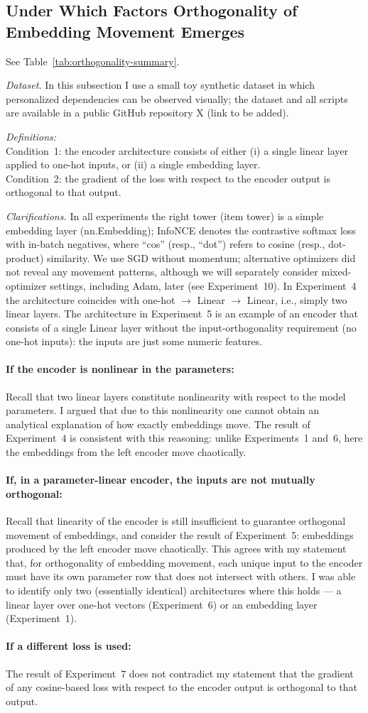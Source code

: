 \subsection{Under Which Factors Orthogonality of Embedding Movement Emerges}

See Table~\ref{tab:orthogonality-summary}.

\textit{Dataset.} In this subsection I use a small toy synthetic dataset in which personalized dependencies can be observed visually; the dataset and all scripts are available in a public GitHub repository X (link to be added).

\textit{Definitions:}\\
Condition~1: the encoder architecture consists of either (i) a single linear layer applied to one-hot inputs, or (ii) a single embedding layer.\\ 
Condition~2: the gradient of the loss with respect to the encoder output is orthogonal to that output.

\textit{Clarifications.} In all experiments the right tower (item tower) is a simple embedding layer (nn.Embedding); InfoNCE denotes the contrastive softmax loss with in-batch negatives, where ``cos'' (resp., ``dot'') refers to cosine (resp., dot-product) similarity. We use SGD without momentum; alternative optimizers did not reveal any movement patterns, although we will separately consider mixed-optimizer settings, including Adam, later (see Experiment~10). In Experiment~4 the architecture coincides with one-hot $\to$ Linear $\to$ Linear, i.e., simply two linear layers. The architecture in Experiment~5 is an example of an encoder that consists of a single Linear layer without the input-orthogonality requirement (no one-hot inputs): the inputs are just some numeric features.

\paragraph{If the encoder is nonlinear in the parameters:}
Recall that two linear layers constitute nonlinearity with respect to the model parameters. I argued that due to this nonlinearity one cannot obtain an analytical explanation of how exactly embeddings move. The result of Experiment~4 is consistent with this reasoning: unlike Experiments~1 and~6, here the embeddings from the left encoder move chaotically.

\paragraph{If, in a parameter-linear encoder, the inputs are not mutually orthogonal:}
Recall that linearity of the encoder is still insufficient to guarantee orthogonal movement of embeddings, and consider the result of Experiment~5: embeddings produced by the left encoder move chaotically. This agrees with my statement that, for orthogonality of embedding movement, each unique input to the encoder must have its own parameter row that does not intersect with others. I was able to identify only two (essentially identical) architectures where this holds — a linear layer over one-hot vectors (Experiment~6) or an embedding layer (Experiment~1).

\paragraph{If a different loss is used:}
The result of Experiment~7 does not contradict my statement that the gradient of any cosine-based loss with respect to the encoder output is orthogonal to that output.
